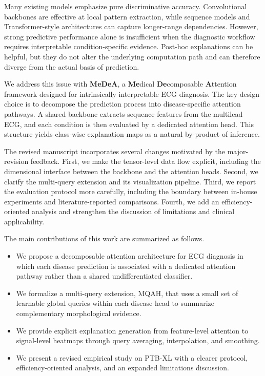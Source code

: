 \documentclass[11pt]{article}
\begin{document}
Many existing models emphasize pure discriminative accuracy. Convolutional backbones are effective at local pattern extraction, while sequence models and Transformer-style architectures can capture longer-range dependencies. However, strong predictive performance alone is insufficient when the diagnostic workflow requires interpretable condition-specific evidence. Post-hoc explanations can be helpful, but they do not alter the underlying computation path and can therefore diverge from the actual basis of prediction.

We address this issue with \textbf{MeDeA}, a \textbf{Me}dical \textbf{De}composable \textbf{A}ttention framework designed for intrinsically interpretable ECG diagnosis. The key design choice is to decompose the prediction process into disease-specific attention pathways. A shared backbone extracts sequence features from the multilead ECG, and each condition is then evaluated by a dedicated attention head. This structure yields class-wise explanation maps as a natural by-product of inference.

The revised manuscript incorporates several changes motivated by the major-revision feedback. First, we make the tensor-level data flow explicit, including the dimensional interface between the backbone and the attention heads. Second, we clarify the multi-query extension and its visualization pipeline. Third, we report the evaluation protocol more carefully, including the boundary between in-house experiments and literature-reported comparisons. Fourth, we add an efficiency-oriented analysis and strengthen the discussion of limitations and clinical applicability.

The main contributions of this work are summarized as follows.

\begin{itemize}
    \item We propose a decomposable attention architecture for ECG diagnosis in which each disease prediction is associated with a dedicated attention pathway rather than a shared undifferentiated classifier.
    \item We formalize a multi-query extension, MQAH, that uses a small set of learnable global queries within each disease head to summarize complementary morphological evidence.
    \item We provide explicit explanation generation from feature-level attention to signal-level heatmaps through query averaging, interpolation, and smoothing.
    \item We present a revised empirical study on PTB-XL with a clearer protocol, efficiency-oriented analysis, and an expanded limitations discussion.
\end{itemize}
\end{document}
